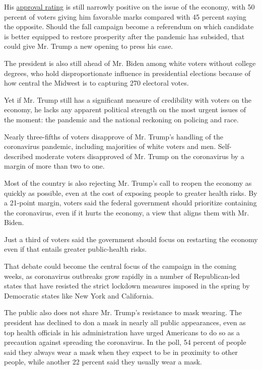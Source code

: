 His
\href{https://www.nytimes.com/2020/06/28/us/politics/trump-approval-older-voters-coronavirus.html}{approval
rating} is still narrowly positive on the issue of the economy, with 50
percent of voters giving him favorable marks compared with 45 percent
saying the opposite. Should the fall campaign become a referendum on
which candidate is better equipped to restore prosperity after the
pandemic has subsided, that could give Mr. Trump a new opening to press
his case.

The president is also still ahead of Mr. Biden among white voters
without college degrees, who hold disproportionate influence in
presidential elections because of how central the Midwest is to
capturing 270 electoral votes.

Yet if Mr. Trump still has a significant measure of credibility with
voters on the economy, he lacks any apparent political strength on the
most urgent issues of the moment: the pandemic and the national
reckoning on policing and race.

Nearly three-fifths of voters disapprove of Mr. Trump's handling of the
coronavirus pandemic, including majorities of white voters and men.
Self-described moderate voters disapproved of Mr. Trump on the
coronavirus by a margin of more than two to one.

Most of the country is also rejecting Mr. Trump's call to reopen the
economy as quickly as possible, even at the cost of exposing people to
greater health risks. By a 21-point margin, voters said the federal
government should prioritize containing the coronavirus, even if it
hurts the economy, a view that aligns them with Mr. Biden.

Just a third of voters said the government should focus on restarting
the economy even if that entails greater public-health risks.

That debate could become the central focus of the campaign in the coming
weeks, as coronavirus outbreaks grow rapidly in a number of
Republican-led states that have resisted the strict lockdown measures
imposed in the spring by Democratic states like New York and California.

The public also does not share Mr. Trump's resistance to mask wearing.
The president has declined to don a mask in nearly all public
appearances, even as top health officials in his administration have
urged Americans to do so as a precaution against spreading the
coronavirus. In the poll, 54 percent of people said they always wear a
mask when they expect to be in proximity to other people, while another
22 percent said they usually wear a mask.

